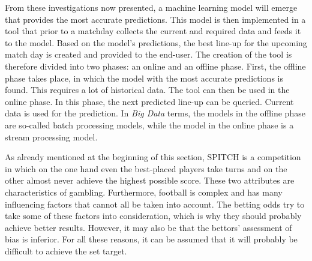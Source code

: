From these investigations now presented, a machine learning model will emerge that provides the most accurate predictions. This model is then implemented in a tool that prior to a matchday collects the current and required data and feeds it to the model. Based on the model's predictions, the best line-up for the upcoming match day is created and provided to the end-user. The creation of the tool is therefore divided into two phases: an online and an offline phase. First, the offline phase takes place, in which the model with the most accurate predictions is found. This requires a lot of historical data. The tool can then be used in the online phase. In this phase, the next predicted line-up can be queried. Current data is used for the prediction. In \emph{Big Data} terms, the models in the offline phase are so-called batch processing models, while the model in the online phase is a stream processing model.

As already mentioned at the beginning of this section, SPITCH is a competition in which on the one hand even the best-placed players take turns and on the other almost never achieve the highest possible score. These two attributes are characteristics of gambling. Furthermore, football is complex and has many influencing factors that cannot all be taken into account. The betting odds try to take some of these factors into consideration, which is why they should probably achieve better results. However, it may also be that the bettors' assessment of bias is inferior. For all these reasons, it can be assumed that it will probably be difficult to achieve the set target. 
